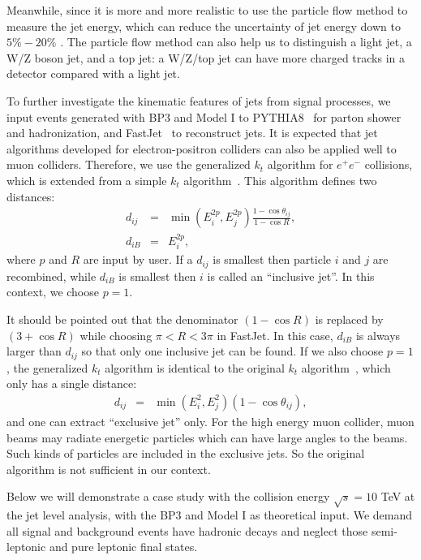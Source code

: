 \documentclass[a4paper,11pt]{article}
\begin{document}
Meanwhile, since it is more and more realistic to use the particle flow method to measure the jet energy, 
which can reduce the uncertainty of jet energy down to $5\%-20\%$ \cite{Nachman:2022emq}. 
 The particle flow method can also help us to distinguish a light jet, 
a W/Z boson jet, and a top jet: a W/Z/top jet can have more charged tracks in a detector compared with a light jet.

To further investigate the kinematic features of jets from signal processes, 
we input events generated with BP3 and Model I to PYTHIA8~\cite{Bierlich:2022pfr} for parton shower and hadronization, 
and FastJet~\cite{Cacciari:2011ma} to reconstruct jets.  
It is expected that jet algorithms developed for electron-positron colliders can also be applied well to muon colliders. 
Therefore, we use the generalized $k_t$ algorithm for $e^+e^-$ collisions,
which is extended from a simple $k_t$ algorithm~\cite{Catani:1991hj}.
This algorithm defines two distances:
\begin{eqnarray}
  d_{ij} &=& \min(E^{2p}_i,E^{2p}_j)\frac{1-\cos\theta_{ij}}{1-\cos{R}}, \label{eq:genkt1}\\
  d_{iB} &=& E^{2p}_i, \label{eq:genkt2}
\end{eqnarray}
where $p$ and $R$ are input by user. 
If a $d_{ij}$ is smallest then particle $i$ and $j$ are recombined, 
while $d_{iB}$ is smallest then $i$ is called an ``inclusive jet''.
In this context, we choose $p=1$.

It should be pointed out that the denominator $(1-\cos{R})$ is replaced by $(3+\cos{R})$ while choosing $\pi<R<3\pi$ in FastJet.
In this case, $d_{iB}$ is always larger than $d_{ij}$ so that only one inclusive jet can be found.  
If we also choose $p=1$, the generalized $k_t$ algorithm is identical to the original $k_t$ algorithm~\cite{Catani:1991hj}, 
which only has a single distance:
\begin{eqnarray}
  d_{ij} &=& \min(E^{2}_i,E^{2}_j)\left(1-\cos\theta_{ij}\right), \label{eq:eekt}
\end{eqnarray}
and one can extract ``exclusive jet'' only. 
For the high energy muon collider, muon beams may radiate energetic particles which can have large angles to the beams. 
Such kinds of particles are included in the exclusive jets. 
So the original algorithm is not sufficient in our context.

Below we will demonstrate a case study with the collision energy $\sqrt{s}=10$ TeV at the jet level analysis, 
with the BP3 and Model I as theoretical input. 
We demand all signal and background events have hadronic decays and neglect those semi-leptonic and pure leptonic final states. 
\end{document}
